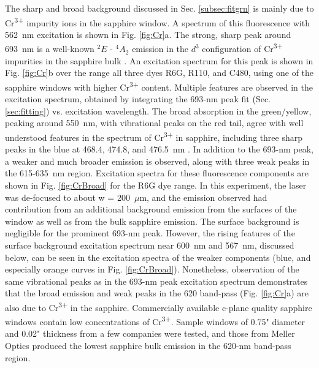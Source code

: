 The sharp and broad background discussed in Sec. \ref{subsec:fitgrn} is mainly due to Cr\textsuperscript{3+} impurity ions in the sapphire window.  A spectrum of this fluorescence with 562~nm excitation is shown in Fig. \ref{fig:Cr}a.  The strong, sharp peak around 693~nm is a well-known $^{2}E$ - $^{4}A_{2}$ emission in the $d^{3}$ configuration of Cr\textsuperscript{3+} impurities in the sapphire bulk \cite{SapphireRlines1964,SapphireRlines2010}.  An excitation spectrum for this peak is shown in Fig. \ref{fig:Cr}b over the range all three dyes R6G, R110, and C480, using one of the sapphire windows with higher Cr\textsuperscript{3+} content.  Multiple features are observed in the excitation spectrum, obtained by integrating the 693-nm peak fit (Sec. \ref{sec:fitting}) vs. excitation wavelength.  The broad absorption in the green/yellow, peaking around 550~nm, with vibrational peaks on the red tail, agree with well understood features in the spectrum of Cr\textsuperscript{3+} in sapphire, including three sharp peaks in the blue at 468.4, 474.8, and 476.5~nm \cite{SapphireFord,SapphireMcclure}.  In addition to the 693-nm peak, a weaker and much broader emission is observed, along with three weak peaks in the 615-635~nm region.  Excitation spectra for these fluorescence components are shown in Fig. \ref{fig:CrBroad} for the R6G dye range.  In this experiment, the laser was de-focused to about w = 200~$\mu$m, and the emission observed had contribution from an additional background emission from the surfaces of the window as well as from the bulk sapphire emission.  The surface background is negligible for the prominent 693-nm peak.  However, the rising features of the surface background excitation spectrum near 600~nm and 567~nm, discussed below, can be seen in the excitation spectra of the weaker components (blue, and especially orange curves in Fig. \ref{fig:CrBroad}).  Nonetheless, observation of the same vibrational peaks as in the 693-nm peak excitation spectrum demonstrates that the broad emission and weak peaks in the 620 band-pass (Fig. \ref{fig:Cr}a) are also due to Cr\textsuperscript{3+} in the sapphire.  Commercially available c-plane quality sapphire windows contain low concentrations of Cr\textsuperscript{3+}.  Sample windows of 0.75" diameter and 0.02" thickness from a few companies were tested, and those from Meller Optics produced the lowest sapphire bulk emission in the 620-nm band-pass region.


